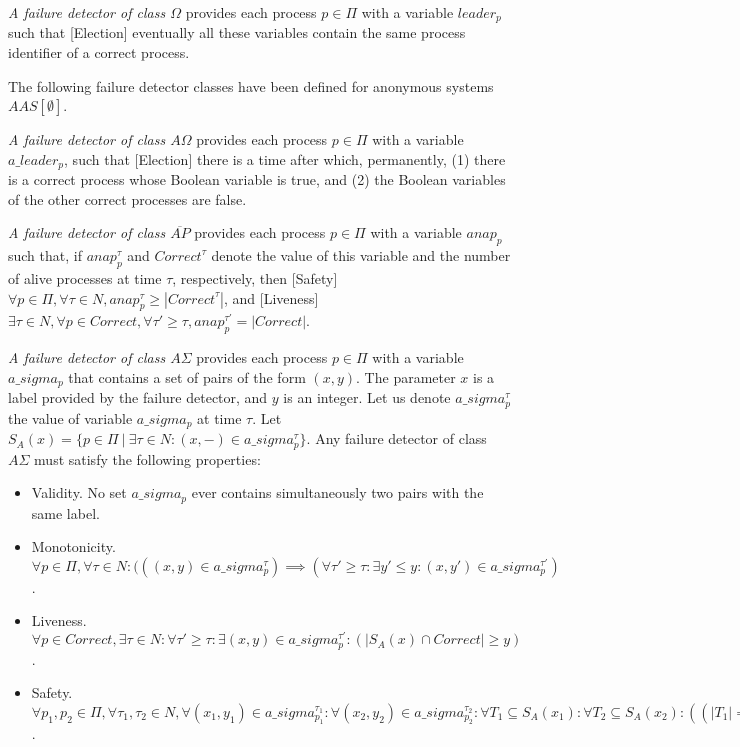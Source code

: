 \documentclass[10pt, conference, compsocconf]{IEEEtran}
\newcommand{\AO}{{A\Omega}}
\newcommand{\AS}{{A\Sigma}}
\newcommand{\NAP}{{ \overline{\mathit{AP}}}}
\newcommand{\C}{{\mathit{Correct}}}
\begin{document}
\emph{A failure detector of class $\Omega$}
 \cite{DBLP:journals/jacm/ChandraHT96}
provides each process  $p \in \Pi$ with a variable $leader_p$ such that 
[Election] eventually all these variables contain the same process 
identifier of a correct process.


The following failure detector classes have been defined for
 anonymous systems $AAS[\emptyset]$.
 
\emph{A failure detector of class $\AO$} \cite{DBLP:conf/wdag/BonnetR10}
provides each process $p \in \Pi$ with a variable $a\_leader_p$, such 
that [Election] there is a time after which, permanently, (1) there is 
a correct process whose Boolean variable is true,
 and (2) the Boolean variables of the other correct processes are false.
 
\emph{A failure detector of class $\NAP$} \cite{DBLP:conf/wdag/BonnetR09}
provides each process  $p \in \Pi$ with a variable $anap_p$ such that, 
if $anap_p^{\tau}$ and $\C^{\tau}$ denote the value of this variable and 
the number of alive processes at time $\tau$, respectively, then [Safety]
 $\forall p \in \Pi, \forall \tau \in N, anap_p^{\tau} \ge |\C^{\tau}|$, 
and [Liveness]
 $\exists  \tau \in N, \forall p \in \C, 
\forall \tau' \geq \tau, anap_p^{\tau'}=|\C|$.

\emph{A failure detector of class $\AS$} \cite{DBLP:conf/wdag/BonnetR10}
provides each process  $p \in \Pi$ with a variable $a\_sigma_p$ that 
contains a set of pairs of the form $(x,y)$. The parameter $x$ is a 
label provided by the failure detector, and $y$ is an integer. 
Let us denote $a\_sigma_p^\tau$ the value of variable $a\_sigma_p$ at 
time $\tau$. 
Let $S_A(x)=\{p \in \Pi \ |\ \exists \tau \in N : (x,-) \in a\_sigma_p^\tau\}$.
Any failure detector of class $\AS$ must satisfy the following properties: 

\begin{itemize}
\item
Validity.  No set $a\_sigma_p$ ever contains simultaneously two pairs 
with the same label. 
\item Monotonicity. 
$ \forall p \in \Pi , \forall \tau \in N : 
(((x,y) \in a\_sigma_p^{\tau}) \implies 
(\forall \tau' \ge \tau: \exists y' \leq y : (x,y') \in a\_sigma_p^{\tau'})$.
\item
Liveness.
 $\forall p \in \C , \exists \tau \in N: 
  \forall \tau' \ge \tau : \exists (x,y) \in a\_sigma_p^{\tau'} : 
   (|S_A(x) \cap  \C| \ge y)$.
\item
Safety.
$\forall p_1, p_2 \in \Pi , \forall \tau_1, \tau_2 \in N,  
\forall (x_1,y_1) \in a\_sigma_{p_1}^{\tau_1} : 
\forall (x_2,y_2) \in a\_sigma_{p_2}^{\tau_2}: 
 \forall T_1 \subseteq S_A(x_1): \forall T_2 \subseteq S_A(x_2) : 
((|T_1| = y_1) \wedge (|T_2| = y_2)) \implies (T_1 \cap T_2 \not= \emptyset)$.
\end{itemize}
\end{document}
